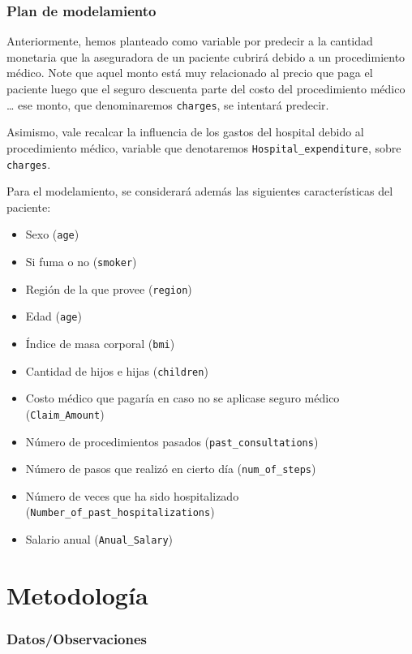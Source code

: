 \documentclass[
]{article}
\providecommand{\tightlist}{%
  \setlength{\itemsep}{0pt}\setlength{\parskip}{0pt}}\usepackage{longtable,booktabs,array}
\begin{document}
\subsubsection{Plan de modelamiento}\label{plan-de-modelamiento}

Anteriormente, hemos planteado como variable por predecir a la cantidad
monetaria que la aseguradora de un paciente cubrirá debido a un
procedimiento médico. Note que aquel monto está muy relacionado al
precio que paga el paciente luego que el seguro descuenta parte del
costo del procedimiento médico \ldots{} ese monto, que denominaremos
\texttt{charges}, se intentará predecir.

Asimismo, vale recalcar la influencia de los gastos del hospital debido
al procedimiento médico, variable que denotaremos
\texttt{Hospital\_expenditure}, sobre \texttt{charges}.

Para el modelamiento, se considerará además las siguientes
características del paciente:

\begin{itemize}
\tightlist
\item
  Sexo (\texttt{age})
\item
  Si fuma o no (\texttt{smoker})
\item
  Región de la que provee (\texttt{region})
\item
  Edad (\texttt{age})
\item
  Índice de masa corporal (\texttt{bmi})
\item
  Cantidad de hijos e hijas (\texttt{children})
\item
  Costo médico que pagaría en caso no se aplicase seguro médico
  (\texttt{Claim\_Amount})
\item
  Número de procedimientos pasados (\texttt{past\_consultations})
\item
  Número de pasos que realizó en cierto día (\texttt{num\_of\_steps})
\item
  Número de veces que ha sido hospitalizado
  (\texttt{Number\_of\_past\_hospitalizations})
\item
  Salario anual (\texttt{Anual\_Salary})
\end{itemize}

\section{Metodología}

\subsubsection{Datos/Observaciones}\label{datosobservaciones}
\end{document}
